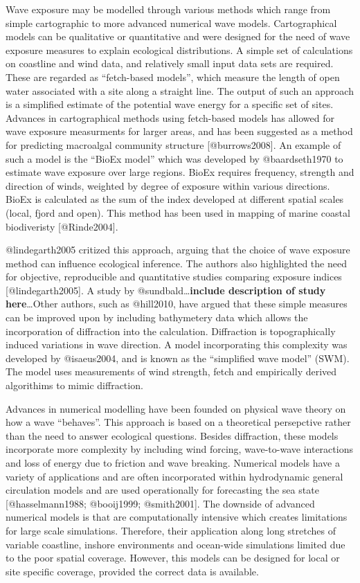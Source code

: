 \documentclass[]{article}
\begin{document}
Wave exposure may be modelled through various methods which range from
simple cartographic to more advanced numerical wave models.
Cartographical models can be qualitative or quantitative and were
designed for the need of wave exposure measures to explain ecological
distributions. A simple set of calculations on coastline and wind data,
and relatively small input data sets are required. These are regarded as
``fetch-based models'', which measure the length of open water
associated with a site along a straight line. The output of such an
approach is a simplified estimate of the potential wave energy for a
specific set of sites. Advances in cartographical methods using
fetch-based models has allowed for wave exposure measurments for larger
areas, and has been suggested as a method for predicting macroalgal
community structure {[}@burrows2008{]}. An example of such a model is
the ``BioEx model'' which was developed by @baardseth1970 to estimate
wave exposure over large regions. BioEx requires frequency, strength and
direction of winds, weighted by degree of exposure within various
directions. BioEx is calculated as the sum of the index developed at
different spatial scales (local, fjord and open). This method has been
used in mapping of marine coastal biodiveristy {[}@Rinde2004{]}.

@lindegarth2005 critized this approach, arguing that the choice of wave
exposure method can influence ecological inference. The authors also
highlighted the need for objective, reproducible and quantitative
studies comparing exposure indices {[}@lindegarth2005{]}. A study by
@sundbald\ldots{}\textbf{include description of study here}\ldots{}Other
authors, such as @hill2010, have argued that these simple measures can
be improved upon by including bathymetery data which allows the
incorporation of diffraction into the calculation. Diffraction is
topographically induced variations in wave direction. A model
incorporating this complexity was developed by @isaeus2004, and is known
as the ``simplified wave model'' (SWM). The model uses measurements of
wind strength, fetch and empirically derived algorithims to mimic
diffraction.

Advances in numerical modelling have been founded on physical wave
theory on how a wave ``behaves''. This approach is based on a
theoretical persepctive rather than the need to answer ecological
questions. Besides diffraction, these models incorporate more complexity
by including wind forcing, wave-to-wave interactions and loss of energy
due to friction and wave breaking. Numerical models have a variety of
applications and are often incorporated within hydrodynamic general
circulation models and are used operationally for forecasting the sea
state {[}@hasselmann1988; @booij1999; @smith2001{]}. The downside of
advanced numerical models is that are computationally intensive which
creates limitations for large scale simulations. Therefore, their
application along long stretches of variable coastline, inshore
environments and ocean-wide simulations limited due to the poor spatial
coverage. However, this models can be designed for local or site
specific coverage, provided the correct data is available.
\end{document}
